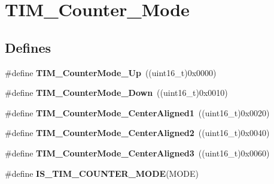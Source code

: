 \hypertarget{group__TIM__Counter__Mode}{
\section{TIM\_\-Counter\_\-Mode}
\label{group__TIM__Counter__Mode}
}
\subsection*{Defines}
\begin{DoxyCompactItemize}
\item 
\hypertarget{group__TIM__Counter__Mode_gaf4cd3ce74af3122507b77c8f6e79c832}{
\#define {\bfseries TIM\_\-CounterMode\_\-Up}~((uint16\_\-t)0x0000)}
\label{group__TIM__Counter__Mode_gaf4cd3ce74af3122507b77c8f6e79c832}

\item 
\hypertarget{group__TIM__Counter__Mode_gadd7c4200d185bdcd9e64ae80e6b200b0}{
\#define {\bfseries TIM\_\-CounterMode\_\-Down}~((uint16\_\-t)0x0010)}
\label{group__TIM__Counter__Mode_gadd7c4200d185bdcd9e64ae80e6b200b0}

\item 
\hypertarget{group__TIM__Counter__Mode_gac07392e9637f8a0d115d4ba9a002ae93}{
\#define {\bfseries TIM\_\-CounterMode\_\-CenterAligned1}~((uint16\_\-t)0x0020)}
\label{group__TIM__Counter__Mode_gac07392e9637f8a0d115d4ba9a002ae93}

\item 
\hypertarget{group__TIM__Counter__Mode_ga3793122e4c123a99e46fc2f04acea0d4}{
\#define {\bfseries TIM\_\-CounterMode\_\-CenterAligned2}~((uint16\_\-t)0x0040)}
\label{group__TIM__Counter__Mode_ga3793122e4c123a99e46fc2f04acea0d4}

\item 
\hypertarget{group__TIM__Counter__Mode_ga65d9bc01ffa287cd7cf200d08c20a1ce}{
\#define {\bfseries TIM\_\-CounterMode\_\-CenterAligned3}~((uint16\_\-t)0x0060)}
\label{group__TIM__Counter__Mode_ga65d9bc01ffa287cd7cf200d08c20a1ce}

\item 
\#define {\bfseries IS\_\-TIM\_\-COUNTER\_\-MODE}(MODE)
\end{DoxyCompactItemize}


